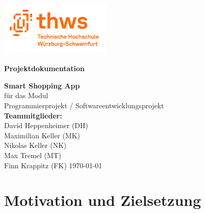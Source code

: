 \documentclass[12pt, a4paper]{report} %
\begin{document}
\begin{titlepage}
    \begin{center}
        \includegraphics[width=0.4\textwidth]{media/THWS_logo.png}
    \end{center}
    \centering
    \vspace*{2cm}
    {\LARGE\bfseries Projektdokumentation \par}
    \vspace{1.5cm}
    {\Large \textbf{Smart Shopping App} \\[3mm]}
    \vspace{1cm}
    {\large für das Modul\\
      Programmierprojekt / Softwareentwicklungsprojekt\\}
    \vspace{1.5cm}
    {\large
      \textbf{Teammitglieder:}\\[5mm]
      David Heppenheimer (DH)\\
      Maximilian Keller (MK)\\
      Nikolas Keller (NK)\\
      Max Tremel (MT)\\
      Finn Krappitz (FK)
    }
    \vfill
    {\large \today}
\end{titlepage}

\tableofcontents
\cleardoublepage

\chapter{Motivation und Zielsetzung}














  



\end{document}
